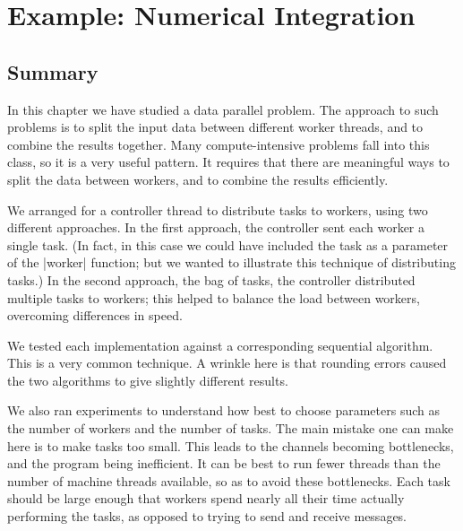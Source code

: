 \chapter{Example: Numerical Integration}
\label{chap:trapezium}



\section{Summary}

In this chapter we have studied a data parallel problem.  The approach to such problems is to split the input data
between different worker threads, and to combine the results together.  Many
compute-intensive problems fall into this class, so it is a very useful
pattern.  It requires that there are meaningful ways to split the data between
workers, and to combine the results efficiently.

We arranged for a controller thread to distribute tasks to workers, using two
different approaches.  In the first approach, the controller sent each worker
a single task.  (In fact, in this case we could have included the task as a
parameter of the |worker| function; but we wanted to illustrate this technique
of distributing tasks.)  In the second approach, the bag of tasks, the
controller distributed multiple tasks to workers; this helped to balance the
load between workers, overcoming differences in speed.

We tested each implementation against a corresponding sequential algorithm.
This is a very common technique.  A wrinkle here is that rounding errors
caused the two algorithms to give slightly different results.  

We also ran experiments to understand how best to choose parameters such as
the number of workers and the number of tasks.  The main mistake one can make
here is to make tasks  too small.  This leads to the channels becoming
bottlenecks, and the program being inefficient.  It can be best to run fewer
threads than the number of machine threads available, so as to avoid these
bottlenecks.  
Each task should be large enough that workers spend nearly all
their time actually performing the tasks, as opposed to trying to send and
receive messages.

